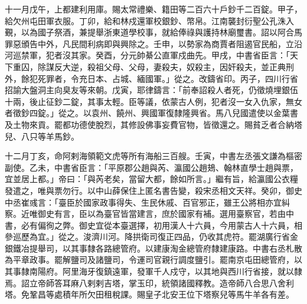\begin{pinyinscope}
 十一月戊午，上都建利用庫。賜太常禮樂、籍田等二百六十戶鈔千二百錠。甲子，給欠州屯田軍衣服。丁卯，給和林戍還軍校銀鈔、幣帛。江南襲封衍聖公孔洙入覲，以為國子祭酒，兼提舉浙東道學校事，就給俸祿與護持林廟璽書。詔以阿合馬罪惡頒告中外，凡民間利病即與興除之。壬申，以勢家為商賈者阻遏官民船，立沿河巡禁軍，犯者沒其家。癸酉，分元帥綦公直軍戍曲先。甲戌，中書省臣言：「天下重囚，除謀反大逆，殺祖父母、父母，妻殺夫，奴殺主，因奸殺夫，並正典刑外，餘犯死罪者，令充日本、占城、緬國軍。」從之。改鑄省印。丙子，四川行省招諭大盤洞主向臭友等來朝。戊寅，耶律鑄言：「前奉詔殺人者死，仍徵燒埋銀伍十兩，後止征鈔二錠，其事太輕。臣等議，依蒙古人例，犯者沒一女入仇家，無女者徵鈔四錠。」從之。以袁州、饒州、興國軍復隸隆興省。馬八兒國遣使以金葉書及土物來貢。罷都功德使脫烈，其修設佛事妄費官物，皆徵還之。賜貧乏者合納塔兒、八只等羊馬鈔。



 十二月丁亥，命阿剌海領範文虎等所有海船三百艘。壬寅，中書左丞張文謙為樞密副使。乙未，中書省臣言：「平原郡公趙與芮、瀛國公趙鳷、翰林直學士趙與票，宜並居上都。」帝曰：「與芮老矣，當留大都，餘如所言。」繼有旨，給瀛國公衣糧發遣之，唯與票勿行。以中山薛保住上匿名書告變，殺宋丞相文天祥。癸卯，御史中丞崔彧言：「臺臣於國家政事得失、生民休戚、百官邪正，雖王公將相亦宜糾察。近唯御史有言，臣以為臺官皆當建言，庶於國家有補。選用臺察官，若由中書，必有偏徇之弊。御史宜從本臺選擇，初用漢人十六員，今用蒙古人十六員，相參巡歷為宜。」從之。浚濟川河。降拱衛司復正四品，仍收其虎符。罷湖廣行省金銀鐵冶提舉司，以其事隸各路總管府。以建康淘金總管府隸建康路。中書右丞札散為平章政事。罷解鹽司及諸鹽司，令運司官親行調度鹽引。罷南京屯田總管府，以其事隸南陽府。阿里海牙復鎮遠軍，發軍千人戍守，以其地與西川行省接，就以隸焉。詔立帝師答耳麻八剌剌吉塔，掌玉印，統領諸國釋教。造帝師八合思八舍利塔。免鞏昌等處積年所欠田租稅課。賜皇子北安王位下塔察兒等馬牛羊各有差。




\end{pinyinscope}
